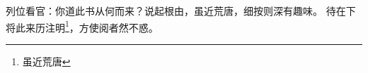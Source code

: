 \documentclass{article}
\begin{document}

\begin{pinyinscope}
列位看官：你道此书从何而来？说起根由，虽近荒唐，细按则深有趣味。
待在下将此来历注明\footnote{虽近荒唐}，方使阅者然不惑。
\end{pinyinscope}




\end{document}
